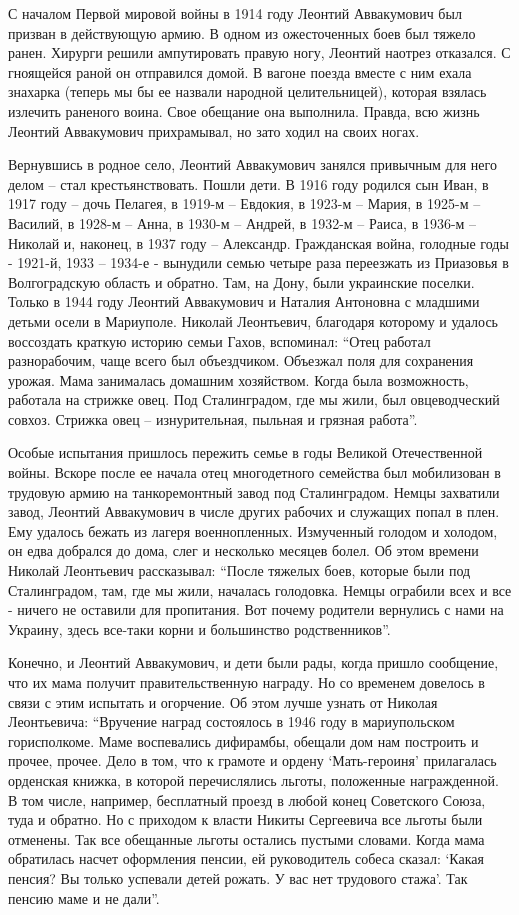 С началом Первой мировой войны в 1914 году Леонтий Аввакумович был призван в
действующую армию. В одном из ожесточенных боев был тяжело ранен. Хирурги
решили ампутировать правую ногу, Леонтий наотрез отказался. С гноящейся раной
он отправился домой. В вагоне поезда вместе с ним ехала знахарка (теперь мы бы
ее назвали народной целительницей), которая взялась излечить раненого воина.
Свое обещание она выполнила. Правда, всю жизнь Леонтий Аввакумович прихрамывал,
но зато ходил на своих ногах.

Вернувшись в родное село, Леонтий Аввакумович занялся привычным для него делом
– стал крестьянствовать. Пошли дети. В 1916 году родился сын Иван, в 1917 году
– дочь Пелагея, в 1919-м – Евдокия, в 1923-м – Мария, в 1925-м – Василий, в
1928-м – Анна, в 1930-м – Андрей, в 1932-м – Раиса, в 1936-м – Николай и,
наконец, в 1937 году – Александр. Гражданская война, голодные годы - 1921-й,
1933 – 1934-е - вынудили семью четыре раза переезжать из Приазовья в
Волгоградскую область и обратно. Там, на Дону, были украинские поселки. Только
в 1944 году  Леонтий Аввакумович и  Наталия Антоновна с младшими детьми осели в
Мариуполе. Николай Леонтьевич, благодаря которому и удалось воссоздать краткую
историю семьи Гахов, вспоминал: \enquote{Отец работал разнорабочим, чаще всего был
объездчиком. Объезжал поля для сохранения урожая. Мама занималась домашним
хозяйством. Когда была возможность, работала на стрижке овец. Под Сталинградом,
где мы жили, был овцеводческий совхоз. Стрижка овец – изнурительная, пыльная и
грязная работа}.

Особые испытания пришлось пережить семье в годы Великой Отечественной войны.
Вскоре после ее начала отец многодетного семейства был мобилизован в трудовую
армию на танкоремонтный завод под Сталинградом. Немцы захватили завод, Леонтий
Аввакумович в числе других рабочих и служащих попал в плен. Ему удалось бежать
из лагеря военнопленных. Измученный голодом и холодом, он едва добрался до
дома, слег и несколько месяцев болел. Об этом времени  Николай Леонтьевич
рассказывал: \enquote{После тяжелых боев, которые были под Сталинградом, там, где мы
жили, началась голодовка. Немцы ограбили всех и все -  ничего не оставили для
пропитания. Вот почему родители вернулись с нами на Украину, здесь все-таки
корни и большинство родственников}.

Конечно, и Леонтий Аввакумович, и дети  были рады, когда пришло сообщение, что
их мама получит правительственную награду. Но со временем довелось в связи с
этим испытать и огорчение. Об этом лучше узнать от Николая Леонтьевича:
\enquote{Вручение наград состоялось в 1946 году в мариупольском горисполкоме. Маме
воспевались дифирамбы, обещали дом нам построить и прочее, прочее. Дело в том,
что к грамоте  и ордену \enquote{Мать-героиня} прилагалась орденская книжка, в которой
перечислялись льготы, положенные награжденной. В том числе, например,
бесплатный проезд в любой конец Советского Союза, туда и обратно. Но с приходом
к власти Никиты Сергеевича все льготы были отменены. Так все обещанные льготы
остались пустыми словами. Когда мама обратилась насчет оформления пенсии, ей
руководитель собеса сказал: \enquote{Какая пенсия? Вы только успевали детей рожать. 
У вас нет трудового стажа}.  Так пенсию маме и не дали}.

